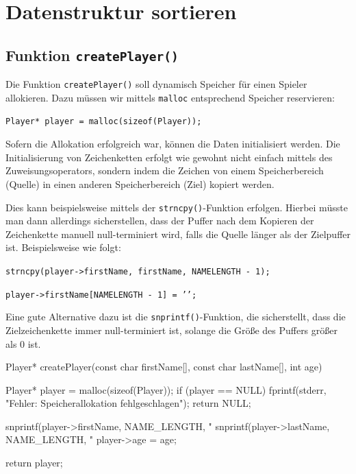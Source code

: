 \chapter{Datenstruktur sortieren}

\section*{Funktion \texttt{createPlayer()}}

Die Funktion \texttt{createPlayer()} soll dynamisch Speicher für einen
Spieler allokieren. Dazu müssen wir mittels \texttt{malloc} entsprechend
Speicher reservieren:

\noindent\texttt{Player* player = malloc(sizeof(Player));}

Sofern die Allokation erfolgreich war, können die Daten initialisiert werden.
Die Initialisierung von Zeichenketten erfolgt wie gewohnt nicht einfach mittels
des Zuweisungsoperators, sondern indem die Zeichen von einem Speicherbereich
(Quelle) in einen anderen Speicherbereich (Ziel) kopiert werden.

Dies kann beispielsweise mittels der \texttt{strncpy()}-Funktion
erfolgen. Hierbei müsste man dann allerdings sicherstellen, dass der Puffer nach
dem Kopieren der Zeichenkette manuell null-terminiert wird, falls die Quelle
länger als der Zielpuffer ist. Beispielsweise wie folgt:

\noindent\texttt{strncpy(player->firstName, firstName, NAMELENGTH - 1);}

\noindent\texttt{player->firstName[NAMELENGTH - 1] = '\0';}

Eine gute Alternative dazu ist die \texttt{snprintf()}-Funktion, die
sicherstellt, dass die Zielzeichenkette immer null-terminiert ist, solange die
Größe des Puffers größer als 0 ist.

\begin{codebox}[lang=c, fontsize=\small]
Player* createPlayer(const char firstName[], const char lastName[], int age) {
    Player* player = malloc(sizeof(Player));
    if (player == NULL) {
        fprintf(stderr, "Fehler: Speicherallokation fehlgeschlagen\n");
        return NULL;
    }

    snprintf(player->firstName, NAME_LENGTH, "%
    snprintf(player->lastName, NAME_LENGTH, "%
    player->age = age;

    return player;
}
\end{codebox}

